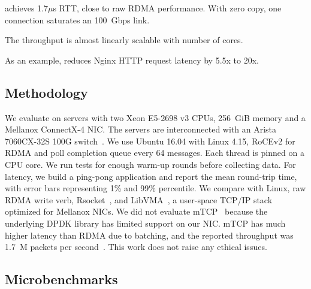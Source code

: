 \sys achieves 1.7$\mu$s RTT, close to raw RDMA performance.
With zero copy, one connection saturates an 100~Gbps link.


The throughput is almost linearly scalable with number of cores. %


As an example, \sys{} reduces Nginx HTTP request latency by 5.5x to 20x.


\subsection{Methodology}
\label{socksdirect:subsec:methodology}

We evaluate \sys on servers with two Xeon E5-2698 v3 CPUs, 256~GiB memory and a Mellanox ConnectX-4 NIC. The servers are interconnected with an Arista 7060CX-32S 100G switch~\cite{arista-7060cx}. We use Ubuntu 16.04 with Linux 4.15, RoCEv2 for RDMA and poll completion queue every 64 messages.
Each thread is pinned on a CPU core. We run tests for enough warm-up rounds before collecting data.
For latency, we build a ping-pong application and report the mean round-trip time, with error bars representing 1\% and 99\% percentile.
We compare with Linux, raw RDMA write verb, Rsocket~\cite{rsockets}, and LibVMA~\cite{libvma}, a user-space TCP/IP stack optimized for Mellanox NICs.
We did not evaluate mTCP~\cite{jeong2014mtcp} because the underlying DPDK library has limited support on our NIC. mTCP has much higher latency than RDMA due to batching, and the reported throughput was 1.7~M packets per second~\cite{kalia2018datacenter}. %
This work does not raise any ethical issues.

\subsection{Microbenchmarks}
\label{socksdirect:subsec:microbenchmark}


